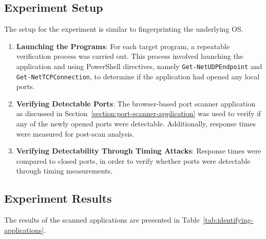 \subsection{Experiment Setup}

The setup for the experiment is similar to fingerprinting the underlying OS.

\begin{enumerate}
    \item \textbf{Launching the Programs}: For each target program, a repeatable verification process was carried out. This process involved launching the application and using PowerShell directives, namely \texttt{Get-NetUDPEndpoint} and \texttt{Get-NetTCPConnection}, to determine if the application had opened any local ports.
    
    \item \textbf{Verifying Detectable Ports}: The browser-based port scanner application as discussed in Section~\ref{section:port-scanner-application} was used to verify if any of the newly opened ports were detectable. Additionally, response times were measured for post-scan analysis.   

    \item \textbf{Verifying Detectability Through Timing Attacks}: Response times were compared to closed ports, in order to verify whether ports were detectable through timing measurements.
\end{enumerate}


\subsection{Experiment Results}

The results of the scanned applications are presented in Table~\ref{tab:identifying-applications}.


